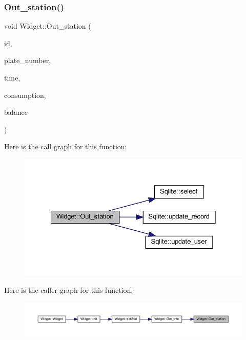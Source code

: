 \subsubsection{\texorpdfstring{Out\_station()}{Out\_station()}}
{\footnotesize\ttfamily void Widget\+::\+Out\+\_\+station (\begin{DoxyParamCaption}\item[{Q\+String}]{id,  }\item[{Q\+String}]{plate\+\_\+number,  }\item[{Q\+String}]{time,  }\item[{float}]{consumption,  }\item[{float}]{balance }\end{DoxyParamCaption})}

Here is the call graph for this function\+:
\nopagebreak
\begin{figure}[H]
\begin{center}
\leavevmode
\includegraphics[width=328pt]{class_widget_a28a22d7c79dd5af8dbe573ace468d61e_cgraph}
\end{center}
\end{figure}
Here is the caller graph for this function\+:
\nopagebreak
\begin{figure}[H]
\begin{center}
\leavevmode
\includegraphics[width=350pt]{class_widget_a28a22d7c79dd5af8dbe573ace468d61e_icgraph}
\end{center}
\end{figure}
\mbox{\label{class_widget_a2f0684dd82782945ee9dc918d9ac30a5}} 
